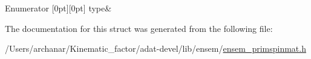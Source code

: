 \begin{DoxyEnumFields}{Enumerator}
[0pt][0pt]{}\mbox{\label{structENSEM_1_1EnsbcIO_3_01PSpinMatrix_3_01T_00_01N_01_4_01_4_a110c5f1d09e2b2f6558f5fc6979b8f13af077b5478aa428f9a9b3c64cb72e8a8c}} 
type&\\
\hline

\end{DoxyEnumFields}


The documentation for this struct was generated from the following file\+:\begin{DoxyCompactItemize}
\item 
/\+Users/archanar/\+Kinematic\+\_\+factor/adat-\/devel/lib/ensem/\mbox{\hyperlink{adat-devel_2lib_2ensem_2ensem__primspinmat_8h}{ensem\+\_\+primspinmat.\+h}}\end{DoxyCompactItemize}

